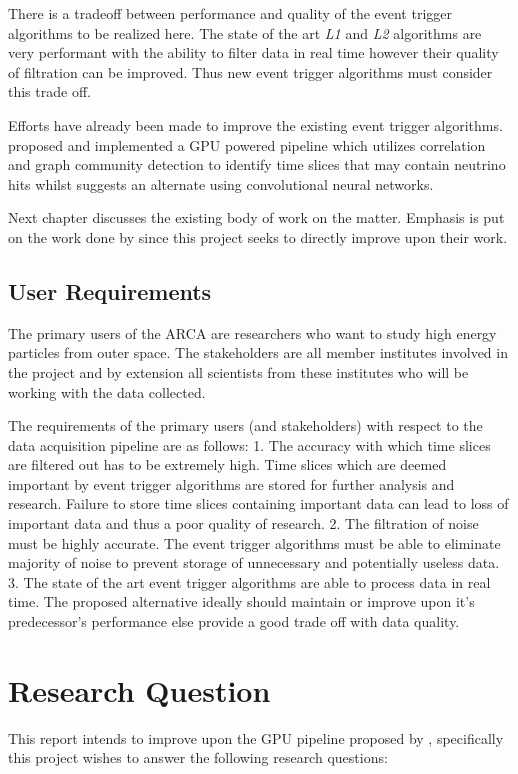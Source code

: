 There is a tradeoff between performance and quality of the event trigger
algorithms to be realized here. The state of the art \emph{L1} and \emph{L2}
algorithms are very performant with the ability to filter data in real time
however their quality of filtration can be improved. Thus new event trigger
algorithms must consider this trade off.

Efforts have already been made to improve the existing event trigger
algorithms. \cite{karas2019data} proposed and implemented a GPU powered
pipeline which utilizes correlation and graph community detection to identify
time slices that may contain neutrino hits whilst \cite{post2019km3nnet}
suggests an alternate using convolutional neural networks.

Next chapter discusses the existing body of work on the matter.
Emphasis is put on the work done by \citeauthor{karas2019data} since
this project seeks to directly improve upon their work.

\subsection{User Requirements}\label{user-requirements}

The primary users of the ARCA are researchers who want to study high energy
particles from outer space. The stakeholders are all member institutes involved
in the project and by extension all scientists from these institutes who will
be working with the data collected.

The requirements of the primary users (and stakeholders) with respect to the
data acquisition pipeline are as follows: 1. The accuracy with which time
slices are filtered out has to be extremely high. Time slices which are deemed
important by event trigger algorithms are stored for further analysis and
research. Failure to store time slices containing important data can lead to
loss of important data and thus a poor quality of research. 2. The filtration
of noise must be highly accurate. The event trigger algorithms must be able to
eliminate majority of noise to prevent storage of unnecessary and potentially
useless data. 3. The state of the art event trigger algorithms are able to
process data in real time. The proposed alternative ideally should maintain or
improve upon it's predecessor's performance else provide a good trade off with
data quality.

\section{Research Question}
This report intends to improve upon the GPU pipeline proposed by
\cite{karas2019data}, specifically this project wishes to answer the
following research questions:

